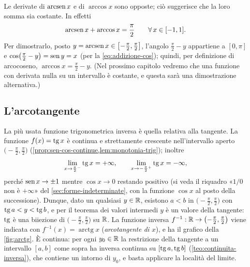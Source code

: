 \begin{osservazione}\label{oss:arcsen-arccos}
Le derivate di $\operatorname{arcsen} x$ e di $\arccos x$ sono opposte; ciò suggerisce che la loro somma
sia costante. In effetti
\begin{equation}\label{eq:arcsen-piu-arccos}
  \operatorname{arcsen} x+\arccos x=\frac\pi2 \qquad\forall\, x\in[-1,1].
\end{equation}
Per dimostrarlo, posto $y=\operatorname{arcsen} x\in\bigl[-\frac\pi2,\frac\pi2\bigr]$, l'angolo
$\frac\pi2-y$ appartiene a $[0,\pi]$ e $\cos\bigl(\frac\pi2-y\bigr)=\operatorname{sen} y=x$ (per la
\eqref{eq:addizione-cos}); quindi, per definizione di arcocoseno,
$\arccos x=\frac\pi2-y$. (Nel prossimo capitolo vedremo che una funzione con derivata nulla
su un intervallo è costante, e questa sarà una dimostrazione alternativa.)
\end{osservazione}

\subsection{L'arcotangente}

La più usata funzione trigonometrica inversa è quella relativa alla tangente. La funzione
$f(x)=\operatorname{tg} x$ è continua e strettamente crescente nell'intervallo aperto
$\bigl(-\frac\pi2,\frac\pi2\bigr)$ (\cref{prop:sen-cos-continue,lem:monotonia-trig});
inoltre
\[
  \lim_{x\to\frac\pi2^{-}}\operatorname{tg} x=+\infty, \qquad \lim_{x\to-\frac\pi2^{+}}\operatorname{tg} x=-\infty,
\]
perché $\operatorname{sen} x\to\pm1$ mentre $\cos x\to0$ restando positivo (si veda il riquadro
«$1/0$ non è $+\infty$» del \cref{sec:forme-indeterminate}, con la funzione $\cos x$ al
posto della successione). Dunque, dato un qualsiasi $y\in\mathbb{R}$, esistono $a<b$ in
$\bigl(-\frac\pi2,\frac\pi2\bigr)$ con $\operatorname{tg} a<y<\operatorname{tg} b$, e per il teorema dei valori intermedi
$y$ è un valore della tangente: $\operatorname{tg}$ è una biiezione di $\bigl(-\frac\pi2,\frac\pi2\bigr)$ su
$\mathbb{R}$. La funzione inversa $f^{-1}:\mathbb{R}\to\bigl(-\frac\pi2,\frac\pi2\bigr)$ viene indicata con
$f^{-1}(x)=\operatorname{arctg}x$ (\emph{arcotangente di $x$}), e ha il grafico della
\cref{fig:arctg}. È continua: per ogni $y_{0}\in\mathbb{R}$ la restrizione della tangente a un
intervallo $[a,b]$ come sopra ha inversa continua su $[\operatorname{tg} a,\operatorname{tg} b]$
(\cref{teo:continuita-inversa}), che contiene un intorno di $y_{0}$, e basta applicare
la località del limite.

